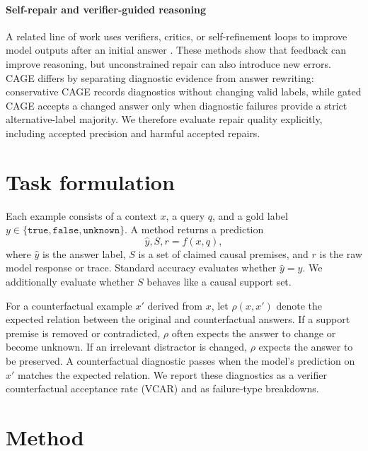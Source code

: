 \documentclass{article}
\begin{document}
\paragraph{Self-repair and verifier-guided reasoning}
A related line of work uses verifiers, critics, or self-refinement loops to improve model outputs after an initial answer \cite{madaan2023self,shinn2023reflexion,vericot2025}. These methods show that feedback can improve reasoning, but unconstrained repair can also introduce new errors. CAGE differs by separating diagnostic evidence from answer rewriting: conservative CAGE records diagnostics without changing valid labels, while gated CAGE accepts a changed answer only when diagnostic failures provide a strict alternative-label majority. We therefore evaluate repair quality explicitly, including accepted precision and harmful accepted repairs.

\section{Task formulation}

Each example consists of a context $x$, a query $q$, and a gold label $y \in \{\texttt{true}, \texttt{false}, \texttt{unknown}\}$. A method returns a prediction
\[
  \hat{y}, S, r = f(x, q),
\]
where $\hat{y}$ is the answer label, $S$ is a set of claimed causal premises, and $r$ is the raw model response or trace. Standard accuracy evaluates whether $\hat{y}=y$. We additionally evaluate whether $S$ behaves like a causal support set.

For a counterfactual example $x'$ derived from $x$, let $\rho(x,x')$ denote the expected relation between the original and counterfactual answers. If a support premise is removed or contradicted, $\rho$ often expects the answer to change or become unknown. If an irrelevant distractor is changed, $\rho$ expects the answer to be preserved. A counterfactual diagnostic passes when the model's prediction on $x'$ matches the expected relation. We report these diagnostics as a verifier counterfactual acceptance rate (VCAR) and as failure-type breakdowns.

\section{Method}
\end{document}
